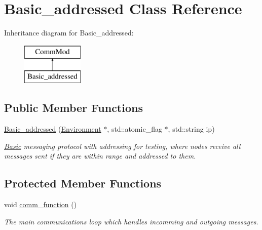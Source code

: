 \hypertarget{class_basic__addressed}{}\section{Basic\+\_\+addressed Class Reference}
\label{class_basic__addressed}
Inheritance diagram for Basic\+\_\+addressed\+:\begin{figure}[H]
\begin{center}
\leavevmode
\includegraphics[height=2.000000cm]{class_basic__addressed}
\end{center}
\end{figure}
\subsection*{Public Member Functions}
\begin{DoxyCompactItemize}
\item 
\hyperlink{class_basic__addressed_a9a202e4eab46bb38b02ca1e0699d3084}{Basic\+\_\+addressed} (\hyperlink{class_environment}{Environment} $\ast$, std\+::atomic\+\_\+flag $\ast$, std\+::string ip)\hypertarget{class_basic__addressed_a9a202e4eab46bb38b02ca1e0699d3084}{}\label{class_basic__addressed_a9a202e4eab46bb38b02ca1e0699d3084}

\begin{DoxyCompactList}\small\item\em \hyperlink{class_basic}{Basic} messaging protocol with addressing for testing, where nodes receive all messages sent if they are within range and addressed to them. \end{DoxyCompactList}\end{DoxyCompactItemize}
\subsection*{Protected Member Functions}
\begin{DoxyCompactItemize}
\item 
void \hyperlink{class_basic__addressed_ac884eb8fca81e164c0f6c073b2d4df80}{comm\+\_\+function} ()
\begin{DoxyCompactList}\small\item\em The main communications loop which handles incomming and outgoing messages. \end{DoxyCompactList}\end{DoxyCompactItemize}
